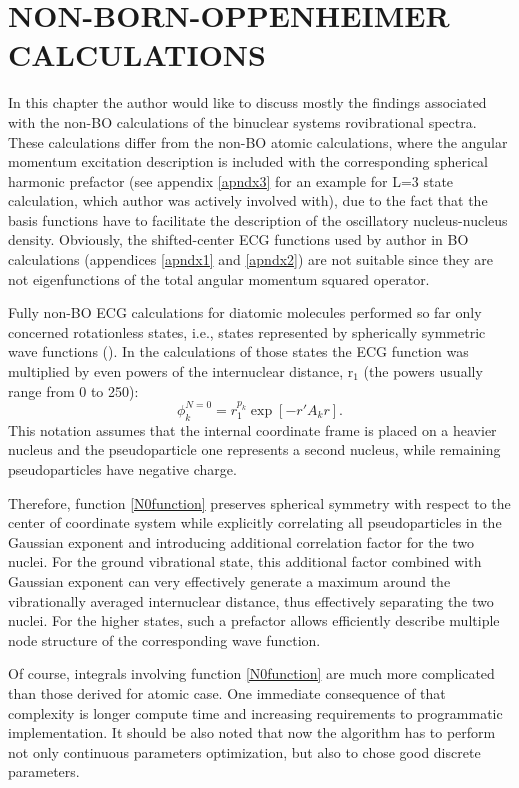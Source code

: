 \chapter{NON-BORN-OPPENHEIMER CALCULATIONS\label{nonBO}}

In this chapter the author would like to discuss mostly the 
findings associated with the non-BO calculations of the binuclear
systems rovibrational spectra. These calculations differ from 
the non-BO atomic calculations, where the angular momentum 
excitation description is included with the corresponding 
spherical harmonic prefactor (see appendix \ref{apndx3} for an
example for L=3 state calculation, which author was actively 
involved with), 
due to the fact that the basis functions have to facilitate the 
description of the oscillatory nucleus-nucleus density.
Obviously, the shifted-center ECG functions used by author in
BO calculations (appendices \ref{apndx1} and \ref{apndx2}) are
not suitable since they are not eigenfunctions of the total
angular momentum squared operator.

Fully non-BO ECG calculations for diatomic molecules performed 
so far only concerned rotationless states, i.e., states represented 
by spherically symmetric wave functions (\cite{N0_1,N0_2}). 
In the calculations of those states the ECG function was multiplied 
by even powers of the internuclear distance, r$_1$ 
(the powers usually range from 0 to 250):
\begin{equation}
\phi_k^{N=0} = r_1^{p_k} \exp [-r'A_k r].
\label{N0function}
\end{equation}
This notation assumes that the internal coordinate frame is placed on a heavier
nucleus and the pseudoparticle one represents a second nucleus, while remaining
pseudoparticles have negative charge.

Therefore, function \ref{N0function} preserves spherical symmetry with respect
to the center of coordinate system while explicitly correlating all pseudoparticles
in the Gaussian exponent and introducing additional correlation factor for
the two nuclei. For the ground vibrational state, this additional factor combined 
with Gaussian exponent can very effectively generate a maximum around the vibrationally
averaged internuclear distance, thus effectively separating the two nuclei.
For the higher states, such a prefactor allows efficiently describe multiple node 
structure of the corresponding wave function.

Of course, integrals involving function \ref{N0function} are much more complicated 
than those derived for atomic case. One immediate consequence of that complexity 
is longer compute time and increasing requirements to programmatic implementation.
It should be also noted that now the algorithm has to perform not only continuous
parameters optimization, but also to chose good discrete parameters.

